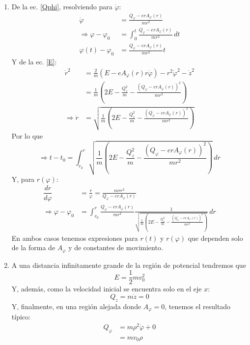 \documentclass[]{article}
\numberwithin{equation}{section}
\newcommand{\0}{\textcolor{gray}{0}}
\newcommand{\td}[2]{\dfrac{d #1}{d #2}}
\begin{document}
\begin{enumerate}
	
	\item[b)] De la ec. \ref{Qphi}, resolviendo para \(\dot{\varphi}\):
	\begin{align}
		\dot{\varphi} &= \frac{Q_\varphi - e r A_\varphi(r)}{m r^2}\\
		\Rightarrow \varphi - \varphi_0 &= \int_{0}^{t} \frac{Q_\varphi - e r A_\varphi(r)}{m r^2} \, dt\nonumber\\
		\varphi(t) - \varphi_0 &= \frac{Q_\varphi - e r A_\varphi(r)}{m r^2} t
	\end{align}
	Y de la ec. \ref{E}:
	\begin{align}
		\dot{r}^2 &= \frac{2}{m}(E - e A_\varphi(r) r \dot{\varphi}) - r^2 \dot{\varphi}^2 - \dot{z}^2\nonumber\\
		&= \frac{1}{m} \left(2 E - \frac{Q_z^2}{m} - \frac{(Q_\varphi - e r A_\varphi(r))^2}{m r^2}\right)\nonumber\\
		\Rightarrow \dot{r} &= \sqrt{\frac{1}{m} \left(2 E - \frac{Q_z^2}{m} - \frac{(Q_\varphi - e r A_\varphi(r))^2}{m r^2}\right)}
	\end{align}
	Por lo que
	\begin{equation}
		\Rightarrow t - t_0 = \int_{r_0}^{r} \sqrt{\frac{1}{m} \left(2 E - \frac{Q_z^2}{m} - \frac{(Q_\varphi - e r A_\varphi(r))^2}{m r^2}\right)}\, dr
	\end{equation}
	Y, para \(r(\varphi)\):
	\begin{align}
		\td{r}{\varphi} &= \frac{\dot{r}}{\dot{\varphi}} = \frac{m \dot{r} r^2}{Q_\varphi - e r A_\varphi(r)} \nonumber\\
		\Rightarrow \varphi - \varphi_0 &= \int_{r_0}^{r} \frac{Q_\varphi - e r A_\varphi(r)} {m r^2} \frac{1}{\sqrt{\frac{1}{m} \left(2 E - \frac{Q_z^2}{m} - \frac{(Q_\varphi - e r A_\varphi(r))^2}{m r^2}\right)}} \, dr \label{phi(r)}
	\end{align}
	En ambos casos tenemos expresiones para \(r(t)\) y \(r(\varphi)\) que dependen solo de la forma de \(A_\varphi\) y de constantes de movimiento.

	\item[c)] A una distancia infinitamente grande de la región de potencial tendremos que
	\begin{equation}
		E = \frac{1}{2} m v_0^2
	\end{equation}
	Y, además, como la velocidad inicial se encuentra solo en el eje \(x\):
	\begin{equation}
		Q_z = m\dot{z} = 0
	\end{equation}
	Y, finalmente, en una región alejada donde \(A_\varphi = 0\), tenemos el resultado típico:
	\begin{align}
		Q_\varphi &= m \rho^2 \dot{\varphi} + 0 \nonumber\\
		&= m v_0 \rho
	\end{align}
	

\end{enumerate}
\end{document}
